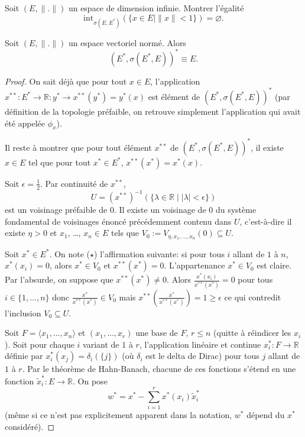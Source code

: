 \begin{exo}
  Soit $(E, \|.\|)$ un espace de dimension infinie. Montrer l'égalité
  $$\mathrm{int}_{\sigma(E, E^*)}(\{x\in E\mid \|x\|<1\})=\varnothing.$$
\end{exo}

\begin{prop}
  Soit $(E, \|.\|)$ un espace vectoriel normé. Alors
  $$(E^*, \sigma(E^*, E))^*\equiv E.$$
\end{prop}
\begin{proof}
  On sait déjà que pour tout $x\in E$, l'application
  $x^{**}: E^*\to \mathbb R: y^*\to x^{**}(y^*) = y^*(x)$ est
  élément de $(E^*, \sigma(E^*, E))^*$ (par définition de la
  topologie préfaible, on retrouve simplement l'application
  qui avait été appelée $\phi_x$).

  Il reste à montrer que pour tout élément $x^{**}$ de
  $(E^*, \sigma(E^*, E))^*$, il existe $x\in E$ tel que
  pour tout $x^*\in E^*$, $x^{**}(x^*) = x^*(x)$.

  Soit $\epsilon=\frac{1}{2}$. Par continuité de $x^{**}$,
  $$U = (x^{**})^{-1}\left(\{\lambda\in\mathbb R\mid
    |\lambda|<\epsilon\}\right)$$
  est un voisinage préfaible de $0$. Il existe un voisinage de $0$ du système
  fondamental de voisinages énoncé précédemment contenu dans $U$, c'est-à-dire
  il existe $\eta > 0$ et $x_1$,
  \ldots, $x_n\in E$ tels que $V_0:=V_{\eta, x_1, \ldots, x_n}(0)\subseteq U$.

  Soit $x^*\in E^*$. On note ($\star$) l'affirmation suivante:
  si pour tous $i$ allant de $1$ à $n$,
  $x^*(x_i) = 0$, alors $x^*\in V_0$ et $x^{**}(x^*) = 0$.
  L'appartenance $x^*\in V_0$ est claire. Par l'absurde,
  on suppose que $x^{**}(x^*)\neq 0$. Alors $\frac{x^*(x_i)}{x^{**}(x^*)}=0$
  pour tous $i\in\{1, \ldots, n\}$ donc $\frac{x^*}{x^{**}(x^*)}\in
  V_0$ mais
  $x^{**}\left( \frac{x^*}{x^{**}(x^*)}\right)=1\geq\epsilon$ ce qui contredit
  l'inclusion $V_0\subseteq U$.

  Soit $F = \langle x_1, \ldots, x_n\rangle$ et $(x_1, \ldots, x_r)$ une base
  de $F$, $r\leq n$ (quitte à réindicer les $x_i$). Soit pour
  chaque $i$ variant de $1$ à $r$, l'application linéaire et continue
  $x^*_i:F\to\mathbb R$  définie par $x^*_i(x_j) =
  \delta_{i}(\{j\})$ (où $\delta_i$ est le delta de Dirac) pour tous $j$
  allant de $1$ à $r$.
  Par le théorème de Hahn-Banach, chacune de ces fonctions s'étend
  en une fonction $\widetilde{x}_i^*: E\to \mathbb R$.
  On pose $$w^* = x^* - \sum_{i=1}^rx^*(x_i)\widetilde{x}_i^*$$
  (même si ce n'est pas explicitement apparent dans la notation,
  $w^*$ dépend du $x^*$ considéré).


\end{proof}
